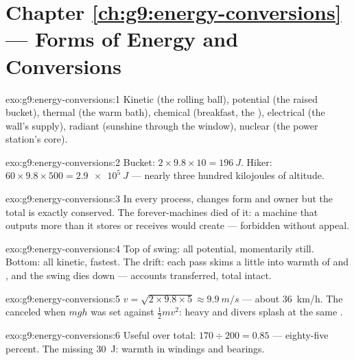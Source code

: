 \section*{Chapter \ref{ch:g9:energy-conversions} --- Forms of Energy and Conversions}

\begin{solution}{exo:g9:energy-conversions:1}
Kinetic (the rolling ball), potential (the raised bucket),
thermal (the warm bath), chemical (breakfast, the ),
electrical (the wall's supply), radiant (sunshine through the
window), nuclear (the power station's core).
\end{solution}

\begin{solution}{exo:g9:energy-conversions:2}
Bucket: $2 \times 9.8 \times 10 = \qty{196}{J}$. Hiker: $60
\times 9.8 \times 500 = \qty{2.9e5}{J}$ --- nearly three
hundred kilojoules of altitude.
\end{solution}

\begin{solution}{exo:g9:energy-conversions:3}
In every process,  changes form and owner but the total
is exactly conserved. The forever-machines died of it: a
machine that outputs more than it stores or receives would
create  --- forbidden without appeal.
\end{solution}

\begin{solution}{exo:g9:energy-conversions:4}
Top of swing: all potential, momentarily still. Bottom: all
kinetic, fastest. The drift: each pass skims a little into
warmth of  and , and the swing dies down --- accounts
transferred, total intact.
\end{solution}

\begin{solution}{exo:g9:energy-conversions:5}
$v = \sqrt{2 \times 9.8 \times 5} \approx \qty{9.9}{m/s}$ ---
about \qty{36}{km/h}. The  canceled when $m g h$ was set
against $\frac12 m v^2$: heavy and  divers splash at the
same .
\end{solution}

\begin{solution}{exo:g9:energy-conversions:6}
Useful over total: $170 \div 200 = 0.85$ --- eighty-five
percent. The missing \qty{30}{J}: warmth in windings and
bearings.
\end{solution}

